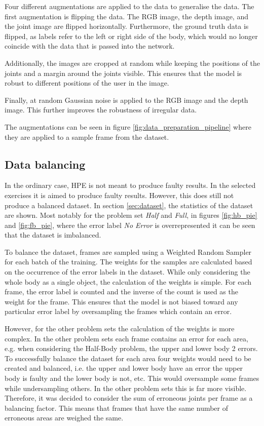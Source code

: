 Four different augmentations are applied to the data to generalise the data. The first augmentation is flipping the data. The RGB image, the depth image, and the joint image are flipped horizontally. Furthermore, the ground truth data is flipped, as labels refer to the left or right side of the body, which would no longer coincide with the data that is passed into the network.

Additionally, the images are cropped at random while keeping the positions of the joints and a margin around the joints visible. This ensures that the model is robust to different positions of the user in the image. 

Finally, at random Gaussian noise is applied to the RGB image and the depth image. This further improves the robustness of irregular data.

The augmentations can be seen in figure \ref{fig:data_preparation_pipeline} where they are applied to a sample frame from the dataset.

\subsection{Data balancing}

In the ordinary case, HPE is not meant to produce faulty results. In the selected exercises it is aimed to produce faulty results. However, this does still not produce a balanced dataset. In section \ref{sec:dataset}, the statistics of the dataset are shown. Most notably for the problem set \textit{Half} and \textit{Full}, in figures \ref{fig:hb_pie} and \ref{fig:fb_pie}, where the error label \textit{No Error} is overrepresented it can be seen that the dataset is imbalanced.

To balance the dataset, frames are sampled using a Weighted Random Sampler for each batch of the training. The weights for the samples are calculated based on the occurrence of the error labels in the dataset. While only considering the whole body as a single object, the calculation of the weights is simple. For each frame, the error label is counted and the inverse of the count is used as the weight for the frame. This ensures that the model is not biased toward any particular error label by oversampling the frames which contain an error.

However, for the other problem sets the calculation of the weights is more complex. In the other problem sets each frame contains an error for each area, e.g. when considering the Half-Body problem, the upper and lower body 2 errors. To successfully balance the dataset for each area four weights would need to be created and balanced, i.e. the upper and lower body have an error the upper body is faulty and the lower body is not, etc. This would oversample some frames while undersampling others. In the other problem sets this is far more visible. Therefore, it was decided to consider the sum of erroneous joints per frame as a balancing factor. This means that frames that have the same number of erroneous areas are weighed the same.
